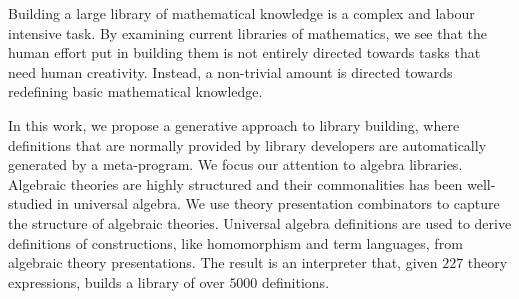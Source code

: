 
Building a large library of mathematical knowledge is a complex and labour intensive task.
By examining current libraries of mathematics, we see that the human effort put in building them is not entirely directed towards tasks that need human creativity. Instead, a non-trivial amount is directed towards redefining basic mathematical knowledge. 

In this work, we propose a generative approach to library building, where definitions that are normally provided by library developers are automatically generated by a meta-program. We focus our attention to algebra libraries. Algebraic theories are highly structured and their commonalities has been well-studied in universal algebra. We use theory presentation combinators to capture the structure of algebraic theories. Universal algebra definitions are used to derive definitions of constructions, like homomorphism and term languages, from algebraic theory presentations. The result is an interpreter that, given $227$ theory expressions, builds a library of over $5000$ definitions.


